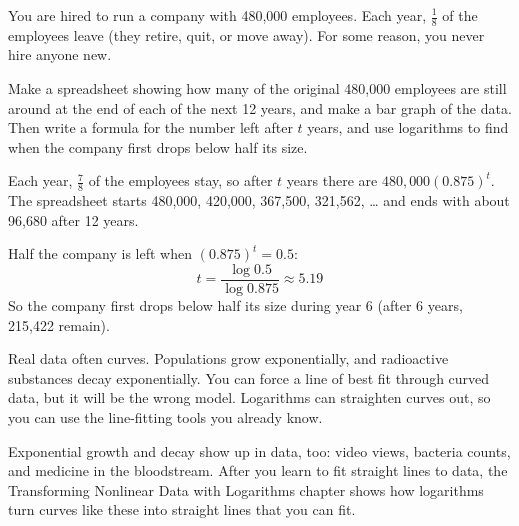 \begin{Exercise}[title={A shrinking company}, label=exp_decay_company]
You are hired to run a company with 480,000 employees. Each year, $\frac{1}{8}$
of the employees leave (they retire, quit, or move away). For some reason,
you never hire anyone new.

Make a spreadsheet showing how many of the original 480,000 employees are
still around at the end of each of the next 12 years, and make a bar graph
of the data. Then write a formula for the number left after $t$ years, and
use logarithms to find when the company first drops below half its size.
\end{Exercise}
\begin{Answer}[ref=exp_decay_company]
Each year, $\frac{7}{8}$ of the employees stay, so after $t$ years there
are $480{,}000(0.875)^t$. The spreadsheet starts 480,000, 420,000, 367,500,
321,562, \ldots{} and ends with about 96,680 after 12 years.

Half the company is left when $(0.875)^t = 0.5$:
$$t = \frac{\log 0.5}{\log 0.875} \approx 5.19$$
So the company first drops below half its size during year 6 (after 6
years, 215,422 remain).
\end{Answer}



Real data often curves. Populations grow exponentially, and radioactive
substances decay exponentially. You can force a line of best fit through
curved data, but it will be the wrong model. Logarithms can straighten
curves out, so you can use the line-fitting tools you already know.

Exponential growth and decay show up in data, too: video views, bacteria counts, and medicine in the
bloodstream. After you learn to fit straight lines to data, the Transforming Nonlinear Data with Logarithms
chapter shows how logarithms turn curves like these into straight lines that you can fit.
